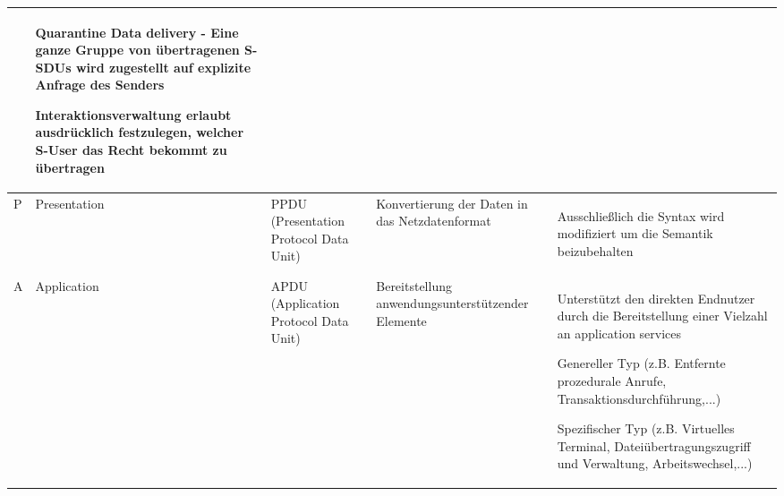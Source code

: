\documentclass[a4paper]{article}
\begin{document}
\begin{tabular}{ l | l | l | p{6cm} | p{10cm} }
\begin{itemize*}
    \end{itemize*}                   & 
    \begin{itemize*}
        \item Quarantine Data delivery - Eine ganze Gruppe von übertragenen S-SDUs wird zugestellt auf explizite Anfrage des Senders
        \item Interaktionsverwaltung erlaubt ausdrücklich festzulegen, welcher S-User das Recht bekommt zu übertragen
    \end{itemize*}
    \\\hline
    P  & Presentation   & PPDU (Presentation Protocol Data Unit) & Konvertierung der Daten in das Netzdatenformat    & 
    \begin{itemize*}
        \item Ausschließlich die Syntax wird modifiziert um die Semantik beizubehalten
    \end{itemize*}
    \\\hline
    A  & Application    & APDU (Application Protocol Data Unit)  & Bereitstellung anwendungsunterstützender Elemente & 
    \begin{itemize*}
        \item Unterstützt den direkten Endnutzer durch die Bereitstellung einer Vielzahl an application services                                               
        \item Genereller Typ (z.B. Entfernte prozedurale Anrufe, Transaktionsdurchführung,...)
        \item Spezifischer Typ (z.B. Virtuelles Terminal, Dateiübertragungszugriff und Verwaltung, Arbeitswechsel,...)
    \end{itemize*}
    \\
\end{tabular}
\end{document}
